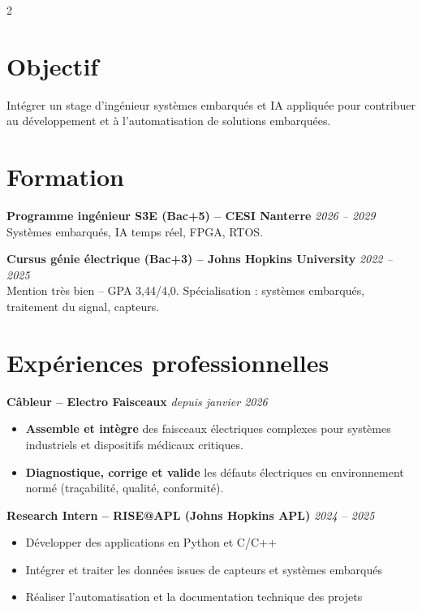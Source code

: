 \documentclass[10pt,a4paper]{article}
\begin{document}
\begin{multicols}{2}

\section*{Objectif}
Intégrer un stage d'ingénieur systèmes embarqués et IA appliquée pour contribuer au développement et à l'automatisation de solutions embarquées.

\section*{Formation}
\textbf{Programme ingénieur S3E (Bac+5) – CESI Nanterre} \hfill \textit{2026 – 2029} \\
Systèmes embarqués, IA temps réel, FPGA, RTOS.

\textbf{Cursus génie électrique (Bac+3) – Johns Hopkins University} \hfill \textit{2022 – 2025} \\
Mention très bien – GPA 3,44/4,0. Spécialisation : systèmes embarqués, traitement du signal, capteurs.


\section*{Expériences professionnelles}
\textbf{Câbleur – Electro Faisceaux} \hfill \textit{depuis janvier 2026}
\begin{itemize}[leftmargin=*]
    \item \textbf{Assemble et intègre} des faisceaux électriques complexes pour systèmes industriels et dispositifs médicaux critiques.
    \item \textbf{Diagnostique, corrige et valide} les défauts électriques en environnement normé (traçabilité, qualité, conformité).
\end{itemize}

\textbf{Research Intern – RISE@APL (Johns Hopkins APL)} \hfill \textit{2024 – 2025}
\begin{itemize}[leftmargin=*]
    \item Développer des applications en Python et C/C++
    \item Intégrer et traiter les données issues de capteurs et systèmes embarqués
    \item Réaliser l'automatisation et la documentation technique des projets
\end{itemize}


\end{multicols}
\end{document}

